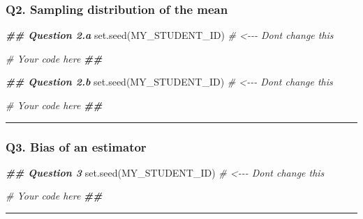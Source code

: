 \documentclass[]{article}
\newenvironment{Shaded}{\begin{snugshade}}{\end{snugshade}}
\newcommand{\CommentTok}[1]{\textcolor[rgb]{0.56,0.35,0.01}{\textit{#1}}}
\newcommand{\DocumentationTok}[1]{\textcolor[rgb]{0.56,0.35,0.01}{\textbf{\textit{#1}}}}
\newcommand{\FunctionTok}[1]{\textcolor[rgb]{0.00,0.00,0.00}{#1}}
\newcommand{\NormalTok}[1]{#1}
\begin{document}
\hypertarget{q2.-sampling-distribution-of-the-mean}{%
\subsubsection{Q2. Sampling distribution of the
mean}\label{q2.-sampling-distribution-of-the-mean}}

\begin{Shaded}
\begin{Highlighting}[]
\DocumentationTok{\#\# Question 2.a}
\FunctionTok{set.seed}\NormalTok{(MY\_STUDENT\_ID) }\CommentTok{\# \textless{}{-}{-}{-} Don\textquotesingle{}t change this}

\CommentTok{\# Your code here}
\DocumentationTok{\#\#}
\end{Highlighting}
\end{Shaded}

\begin{Shaded}
\begin{Highlighting}[]
\DocumentationTok{\#\# Question 2.b}
\FunctionTok{set.seed}\NormalTok{(MY\_STUDENT\_ID) }\CommentTok{\# \textless{}{-}{-}{-} Don\textquotesingle{}t change this}

\CommentTok{\# Your code here}
\DocumentationTok{\#\#}
\end{Highlighting}
\end{Shaded}

\begin{center}\rule{0.5\linewidth}{0.5pt}\end{center}

\hypertarget{q3.-bias-of-an-estimator}{%
\subsubsection{Q3. Bias of an
estimator}\label{q3.-bias-of-an-estimator}}

\begin{Shaded}
\begin{Highlighting}[]
\DocumentationTok{\#\# Question 3}
\FunctionTok{set.seed}\NormalTok{(MY\_STUDENT\_ID) }\CommentTok{\# \textless{}{-}{-}{-} Don\textquotesingle{}t change this}

\CommentTok{\# Your code here}
\DocumentationTok{\#\#}
\end{Highlighting}
\end{Shaded}

\begin{center}\rule{0.5\linewidth}{0.5pt}\end{center}
\end{document}
